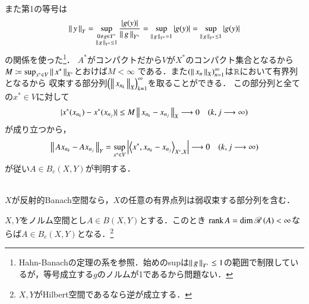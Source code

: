 \begin{prf}
\begin{description}
\begin{description}
						また第1の等号は
						\begin{align}
							\left\|\, y\, \right\|_{Y} = \operatorname*{sup}_{\substack{0 \neq g \in Y^* \\ \left\|\, g\, \right\|_{Y^*}\leq1}} \frac{|g(y)|}{\left\|\, g\, \right\|_{Y^*}} 
							= \operatorname*{sup}_{\left\|\, g\, \right\|_{Y^*}=1} |g(y)| = \operatorname*{sup}_{\left\|\, g\, \right\|_{Y^*} \leq 1} |g(y)|
						\end{align}
						の関係を使った\footnote{Hahn-Banachの定理の系を参照．始めのsupは$\left\|\, g\, \right\|_{Y^*}\leq1$の範囲で制限しているが，等号成立する$g$のノルムが1であるから問題ない．}．
						$A^*$がコンパクトだから$V$が$X^*$のコンパクト集合となるから$M \coloneqq \operatorname*{sup}_{x^* \in V} \left\|\, x^*\, \right\|_{X^*}$とおけば$M < \infty$
						である．また$\left(\left\|\, x_n\, \right\|_{X}\right)_{n=1}^{\infty}$は$\mathbb{R}$において有界列となるから
						収束する部分列$\left(\left\|\, x_{n_k}\, \right\|_{X}\right)_{k=1}^{\infty}$を取ることができる．
						この部分列と全ての$x^* \in V$に対して
						\begin{align}
							|x^*(x_{n_k}) - x^*(x_{n_j})| \leq M\left\|\, x_{n_k} - x_{n_j}\, \right\|_{X} \longrightarrow 0 \quad (k,j \longrightarrow \infty)
						\end{align}
						が成り立つから，
						\begin{align}
							\Norm{Ax_{n_k} - Ax_{n_j}}{Y} = \sup{x^* \in V}{\left|\inprod<x^*,x_{n_k} - x_{n_j}>_{X^*,X}\right|} \longrightarrow 0 \quad (k,j \longrightarrow \infty)
						\end{align}
						が従い$A \in B_c(X,Y)$が判明する．
				\end{description}
				\QED
		\end{description}
	\end{prf}
	
	\begin{itembox}[l]{}
		\begin{thm}[反射的Banach空間の弱点列コンパクト性]\mbox{}\\
			$X$が反射的Banach空間なら，$X$の任意の有界点列は弱収束する部分列を含む．
			\label{thm:weak_seq_compact}
		\end{thm}
	\end{itembox}
	
	\begin{itembox}[l]{}
		\begin{thm}[有限次元空間における有界点列の収束]
			$X,Y$をノルム空間とし$A \in B(X,Y)$とする．このとき
			$\Rank{A} = \Dim{\Ran{A}} < \infty$ならば$A \in B_c(X,Y)$となる．\footnote{$X,Y$がHilbert空間であるなら逆が成立する．}
		\end{thm}
	\end{itembox}
	
